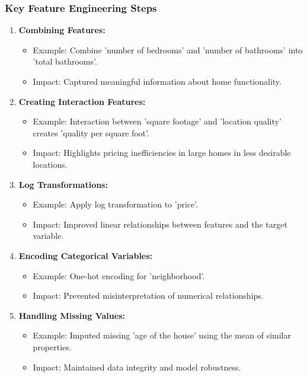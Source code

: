 \documentclass[aspectratio=169]{beamer}
\begin{document}
\begin{frame}[fragile]
    \frametitle{Key Feature Engineering Steps}
    \begin{enumerate}
        \item \textbf{Combining Features:}
            \begin{itemize}
                \item Example: Combine 'number of bedrooms' and 'number of bathrooms' into 'total bathrooms'.
                \item Impact: Captured meaningful information about home functionality.
            \end{itemize}
        \item \textbf{Creating Interaction Features:}
            \begin{itemize}
                \item Example: Interaction between 'square footage' and 'location quality' creates 'quality per square foot'.
                \item Impact: Highlights pricing inefficiencies in large homes in less desirable locations.
            \end{itemize}
        \item \textbf{Log Transformations:}
            \begin{itemize}
                \item Example: Apply log transformation to 'price'.
                \item Impact: Improved linear relationships between features and the target variable.
            \end{itemize}
        \item \textbf{Encoding Categorical Variables:}
            \begin{itemize}
                \item Example: One-hot encoding for 'neighborhood'.
                \item Impact: Prevented misinterpretation of numerical relationships.
            \end{itemize}
        \item \textbf{Handling Missing Values:}
            \begin{itemize}
                \item Example: Imputed missing 'age of the house' using the mean of similar properties.
                \item Impact: Maintained data integrity and model robustness.
            \end{itemize}
    \end{enumerate}
\end{frame}
\end{document}
